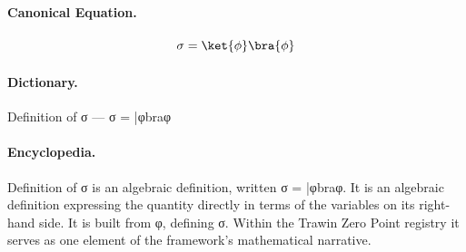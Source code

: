 \paragraph{Canonical Equation.}
\[
\sigma = \ket{\phi}\bra{\phi}
\]

\paragraph{Dictionary.}
Definition of σ — σ = |φbraφ

\paragraph{Encyclopedia.}
Definition of σ is an algebraic definition, written σ = |φbraφ. It is an algebraic definition expressing the quantity directly in terms of the variables on its right-hand side. It is built from φ, defining σ. Within the Trawin Zero Point registry it serves as one element of the framework's mathematical narrative.
